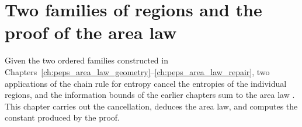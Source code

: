 \chapter{Two families of regions and the proof of the area law}
\label{ch:peps_area_law}

Given the two ordered families constructed in
Chapters~\ref{ch:peps_area_law_geometry}--\ref{ch:peps_area_law_repair}, two
applications of the chain rule for entropy cancel the entropies of the
individual regions, and the information bounds of the earlier chapters sum to
the area law \cite[Section~11]{OpenAI2026AreaLaw}. This chapter carries out the
cancellation, deduces the area law, and computes the constant produced by the
proof.






